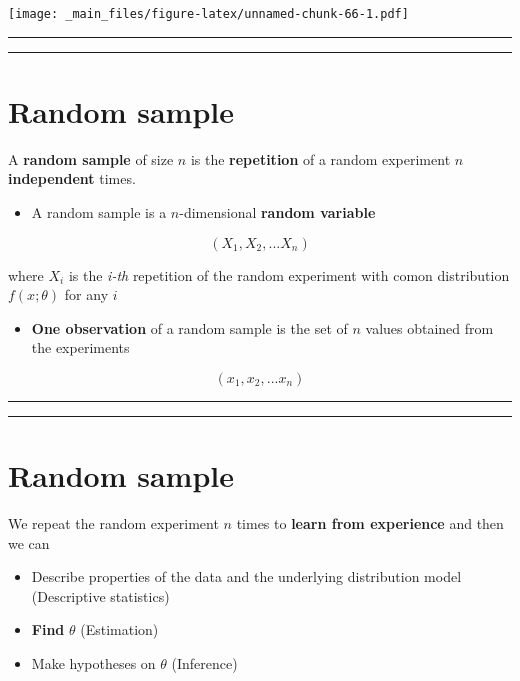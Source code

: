 \documentclass[
]{book}
\providecommand{\tightlist}{%
  \setlength{\itemsep}{0pt}\setlength{\parskip}{0pt}}
\begin{document}
\texttt{[image: \_main\_files/figure-latex/unnamed-chunk-66-1.pdf]}

\begin{center}\rule{0.5\linewidth}{0.5pt}\end{center}

\begin{center}\rule{0.5\linewidth}{0.5pt}\end{center}

\hypertarget{random-sample}{%
\section{Random sample}\label{random-sample}}

A \textbf{random sample} of size \(n\) is the \textbf{repetition} of a random experiment \(n\) \textbf{independent} times.

\begin{itemize}
\tightlist
\item
  A random sample is a \(n\)-dimensional \textbf{random variable}
\end{itemize}

\[(X_1, X_2, ... X_n)\]

where \(X_i\) is the \emph{i-th} repetition of the random experiment with comon distribution \(f(x; \theta)\) for any \(i\)

\begin{itemize}
\tightlist
\item
  \textbf{One observation} of a random sample is the set of \(n\) values obtained from the experiments
\end{itemize}

\[(x_1, x_2, ... x_n)\]

\begin{center}\rule{0.5\linewidth}{0.5pt}\end{center}

\begin{center}\rule{0.5\linewidth}{0.5pt}\end{center}

\hypertarget{random-sample-1}{%
\section{Random sample}\label{random-sample-1}}

We repeat the random experiment \(n\) times to \textbf{learn from experience} and then we can

\begin{itemize}
\item
  Describe properties of the data and the underlying distribution model (Descriptive statistics)
\item
  \textbf{Find} \(\theta\) (Estimation)
\item
  Make hypotheses on \(\theta\) (Inference)
\end{itemize}
\end{document}
